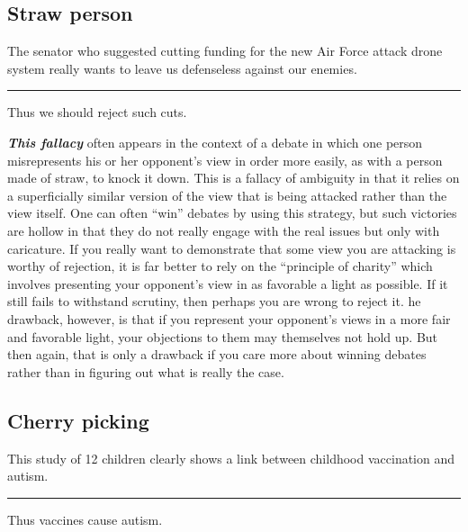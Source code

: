 \documentclass[]{book}
\makeatletter
\newenvironment{kframe}{%
\medskip{}
\setlength{\fboxsep}{.8em}
 \def\at@end@of@kframe{}%
 \ifinner\ifhmode%
  \def\at@end@of@kframe{\end{minipage}}%
  \begin{minipage}{\columnwidth}%
 \fi\fi%
 \def\FrameCommand##1{\hskip\@totalleftmargin \hskip-\fboxsep
 \colorbox{shadecolor}{##1}\hskip-\fboxsep
     \hskip-\linewidth \hskip-\@totalleftmargin \hskip\columnwidth}%
 \MakeFramed {\advance\hsize-\width
   \@totalleftmargin\z@ \linewidth\hsize
   \@setminipage}}%
 {\par\unskip\endMakeFramed%
 \at@end@of@kframe}
\newenvironment{rmdblock}[1]
  {
  \begin{itemize}
  \renewcommand{\labelitemi}{
    \raisebox{-.7\height}[0pt][0pt]{
      {\setkeys{Gin}{width=3em,keepaspectratio}\texttt{[image: img/\#1]}}
    }
  }
  \setlength{\fboxsep}{1em}
  \begin{kframe}
  \item
  }
  {
  \end{kframe}
  \end{itemize}
  }
\newenvironment{rmdwarning}
  {\begin{rmdblock}{warning}}
  {\end{rmdblock}}
\makeatother
\begin{document}
\hypertarget{straw-person}{%
\subsection*{Straw person}\label{straw-person}}


\begin{rmdwarning}
The senator who suggested cutting funding for the new Air Force attack
drone system really wants to leave us defenseless against our enemies.

\begin{center}\rule{0.5\linewidth}{\linethickness}\end{center}

Thus we should reject such cuts.
\end{rmdwarning}

\textbf{\emph{This fallacy}} often appears in the context of a debate in which one person misrepresents his or her opponent's view in order more easily, as with a person made of straw, to knock it down. This is a fallacy of ambiguity in that it relies on a superficially similar version of the view that is being attacked rather than the view itself. One can often ``win'' debates by using this strategy, but such victories are hollow in that they do not really engage with the real issues but only with caricature. If you really want to demonstrate that some view you are attacking is worthy of rejection, it is far better to rely on the ``principle of charity'' which involves presenting your opponent's view in as favorable a light as possible. If it still fails to withstand scrutiny, then perhaps you are wrong to reject it. he drawback, however, is that if you represent your opponent's views in a more fair and favorable light, your objections to them may themselves not hold up. But then again, that is only a drawback if you care more about winning debates rather than in figuring out what is really the case.

\hypertarget{cherry-picking}{%
\subsection*{Cherry picking}\label{cherry-picking}}


\begin{rmdwarning}
This study of 12 children clearly shows a link between childhood
vaccination and autism.

\begin{center}\rule{0.5\linewidth}{\linethickness}\end{center}

Thus vaccines cause autism.
\end{rmdwarning}
\end{document}
